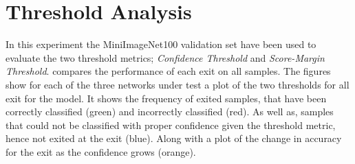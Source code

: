 \section{Threshold Analysis}

In this experiment the MiniImageNet100 validation set have been used to evaluate the two threshold metrics; \emph{Confidence Threshold} and \emph{Score-Margin Threshold}.  compares the performance of each exit on all samples. The figures show for each of the three networks under test a plot of the two thresholds for all exit for the model. It shows the frequency of exited samples, that have been correctly classified (green) and incorrectly classified (red). As well as, samples that could not be classified with proper confidence given the threshold metric, hence not exited at the exit (blue). Along with a plot of the change in accuracy for the exit as the confidence grows (orange).  

